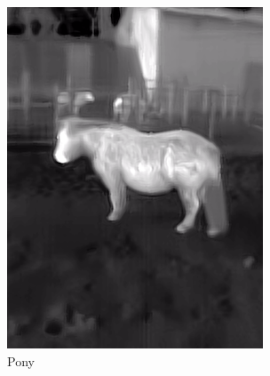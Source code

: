 \documentclass{l4proj}
\begin{document}
\begin{figure}[ht]
\begin{subfigure}[h!]{0.18\textwidth}
    \includegraphics[width=\textwidth, trim={0cm 1.6cm 0cm 1.6cm}, clip]{images/dataset/pony/lwir.png}
    \caption{Pony}
  \end{subfigure}
  \begin{subfigure}[h!]{0.18\textwidth}

\end{subfigure}
\end{figure}
\end{document}

